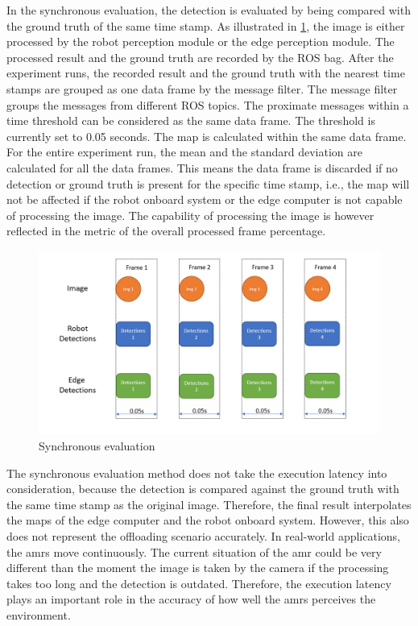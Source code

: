 In the synchronous evaluation, the detection is evaluated by being compared with the ground truth of the same time stamp. As illustrated in \cref{fig:sync_eval}, the image is either processed by the robot perception module or the edge perception module. The processed result and the ground truth are recorded by the ROS bag. After the experiment runs, the recorded result and the ground truth with the nearest time stamps are grouped as one data frame by the message filter. The message filter groups the messages from different ROS topics. The proximate messages within a time threshold can be considered as the same data frame. The threshold is currently set to 0.05 seconds. The \gls{map} is calculated within the same data frame. For the entire experiment run, the mean and the standard deviation are calculated for all the data frames. This means the data frame is discarded if no detection or ground truth is present for the specific time stamp, i.e., the \gls{map} will not be affected if the robot onboard system or the edge computer is not capable of processing the image. The capability of processing the image is however reflected in the metric of the overall processed frame percentage. 

\begin{figure}[htp]
    \centering
    \includegraphics[width=120mm]{figures/setup/sync_eval.png}
    \caption{Synchronous evaluation}
    \label{fig:sync_eval}
\end{figure}

The synchronous evaluation method does not take the execution latency into consideration, because the detection is compared against the ground truth with the same time stamp as the original image. Therefore, the final result interpolates the \glspl{map} of the edge computer and the robot onboard system. However, this also does not represent the offloading scenario accurately. In real-world applications, the \glspl{amr} move continuously. The current situation of the \gls{amr} could be very different than the moment the image is taken by the camera if the processing takes too long and the detection is outdated. Therefore, the execution latency plays an important role in the accuracy of how well the \glspl{amr} perceives the environment. 


